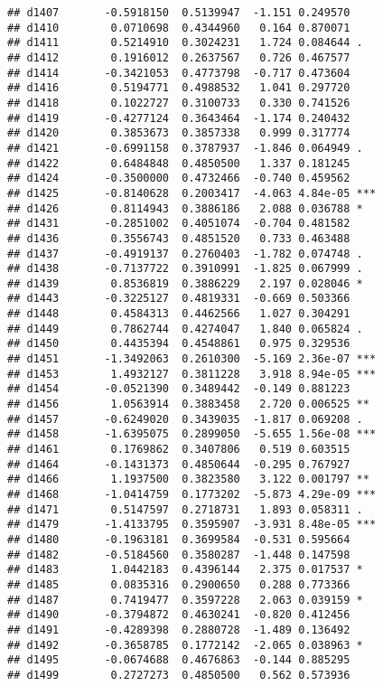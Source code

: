 \documentclass[
]{article}
\begin{document}
\begin{verbatim}
## d1407       -0.5918150  0.5139947  -1.151 0.249570    
## d1410        0.0710698  0.4344960   0.164 0.870071    
## d1411        0.5214910  0.3024231   1.724 0.084644 .  
## d1412        0.1916012  0.2637567   0.726 0.467577    
## d1414       -0.3421053  0.4773798  -0.717 0.473604    
## d1416        0.5194771  0.4988532   1.041 0.297720    
## d1418        0.1022727  0.3100733   0.330 0.741526    
## d1419       -0.4277124  0.3643464  -1.174 0.240432    
## d1420        0.3853673  0.3857338   0.999 0.317774    
## d1421       -0.6991158  0.3787937  -1.846 0.064949 .  
## d1422        0.6484848  0.4850500   1.337 0.181245    
## d1424       -0.3500000  0.4732466  -0.740 0.459562    
## d1425       -0.8140628  0.2003417  -4.063 4.84e-05 ***
## d1426        0.8114943  0.3886186   2.088 0.036788 *  
## d1431       -0.2851002  0.4051074  -0.704 0.481582    
## d1436        0.3556743  0.4851520   0.733 0.463488    
## d1437       -0.4919137  0.2760403  -1.782 0.074748 .  
## d1438       -0.7137722  0.3910991  -1.825 0.067999 .  
## d1439        0.8536819  0.3886229   2.197 0.028046 *  
## d1443       -0.3225127  0.4819331  -0.669 0.503366    
## d1448        0.4584313  0.4462566   1.027 0.304291    
## d1449        0.7862744  0.4274047   1.840 0.065824 .  
## d1450        0.4435394  0.4548861   0.975 0.329536    
## d1451       -1.3492063  0.2610300  -5.169 2.36e-07 ***
## d1453        1.4932127  0.3811228   3.918 8.94e-05 ***
## d1454       -0.0521390  0.3489442  -0.149 0.881223    
## d1456        1.0563914  0.3883458   2.720 0.006525 ** 
## d1457       -0.6249020  0.3439035  -1.817 0.069208 .  
## d1458       -1.6395075  0.2899050  -5.655 1.56e-08 ***
## d1461        0.1769862  0.3407806   0.519 0.603515    
## d1464       -0.1431373  0.4850644  -0.295 0.767927    
## d1466        1.1937500  0.3823580   3.122 0.001797 ** 
## d1468       -1.0414759  0.1773202  -5.873 4.29e-09 ***
## d1471        0.5147597  0.2718731   1.893 0.058311 .  
## d1479       -1.4133795  0.3595907  -3.931 8.48e-05 ***
## d1480       -0.1963181  0.3699584  -0.531 0.595664    
## d1482       -0.5184560  0.3580287  -1.448 0.147598    
## d1483        1.0442183  0.4396144   2.375 0.017537 *  
## d1485        0.0835316  0.2900650   0.288 0.773366    
## d1487        0.7419477  0.3597228   2.063 0.039159 *  
## d1490       -0.3794872  0.4630241  -0.820 0.412456    
## d1491       -0.4289398  0.2880728  -1.489 0.136492    
## d1492       -0.3658785  0.1772142  -2.065 0.038963 *  
## d1495       -0.0674688  0.4676863  -0.144 0.885295    
## d1499        0.2727273  0.4850500   0.562 0.573936    

\end{verbatim}
\end{document}
